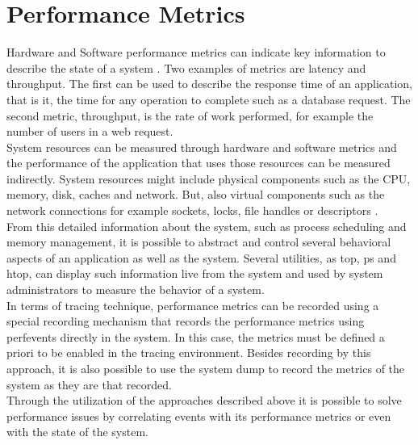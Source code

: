 \section{Performance Metrics}
Hardware and Software performance metrics can indicate key information to describe the state of a system \cite{brendan_book}. Two examples of metrics are latency and throughput. The first can be used to describe the response time of an application, that is it, the time for any operation to complete such as a database request. The second metric, throughput, is the rate of work performed, for example the number of users in a web request.\\
System resources can be measured through hardware and software metrics and the performance of the application that uses those resources can be measured indirectly. System resources might include physical components such as the CPU, memory, disk, caches and network. But, also virtual components such as the network connections  for example sockets, locks, file handles or descriptors \cite{brendan_book}. \\
From this detailed information about the system, such as process scheduling and memory management, it is possible to abstract and control several behavioral aspects of an application as well as the system. Several utilities, as top, ps and htop, can display such information live from the system and used by system administrators to measure the behavior of a system.\\
In terms of tracing technique, performance metrics can be recorded using a special recording mechanism that records the performance metrics using perf\textunderscore events directly in the system. In this case, the metrics must be defined a priori to be enabled in the tracing environment. Besides recording by this approach, it is also possible to use the system dump to record the metrics of the system as they are that recorded. \\
Through the utilization of the approaches described above it is possible to solve performance issues by correlating events with its performance metrics or even with the state of the system.
